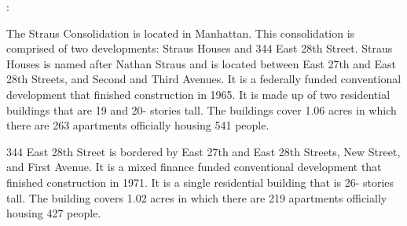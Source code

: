:      

    

The Straus Consolidation is located in Manhattan. This consolidation is comprised of two developments: Straus Houses and 344 East 28th Street. Straus Houses is named after Nathan Straus and is located between East 27th and East 28th Streets, and Second and Third Avenues. It is a federally funded conventional development that finished construction in 1965. It is made up of two residential buildings that are 19 and 20- stories tall. The buildings cover 1.06 acres in which there are 263 apartments officially housing 541 people.  

344 East 28th Street is bordered by East 27th and East 28th Streets, New Street, and First Avenue. It is a mixed finance funded conventional development that finished construction in 1971. It is a single residential building that is 26- stories tall. The building covers 1.02 acres in which there are 219 apartments officially housing 427 people.  